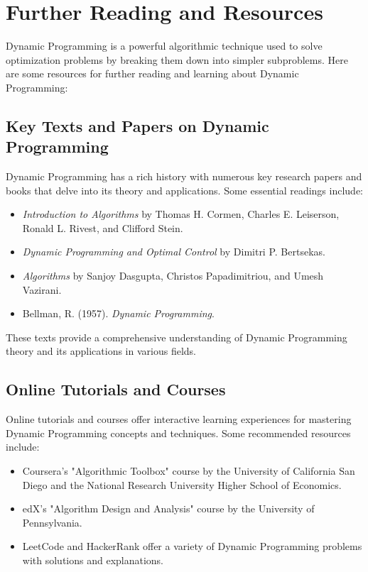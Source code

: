 \documentclass[12pt]{book} %
\begin{document}
\section{Further Reading and Resources}
Dynamic Programming is a powerful algorithmic technique used to solve optimization problems by breaking them down into simpler subproblems. Here are some resources for further reading and learning about Dynamic Programming:

\subsection{Key Texts and Papers on Dynamic Programming}
Dynamic Programming has a rich history with numerous key research papers and books that delve into its theory and applications. Some essential readings include:

\begin{itemize}
    \item \textit{Introduction to Algorithms} by Thomas H. Cormen, Charles E. Leiserson, Ronald L. Rivest, and Clifford Stein.
    \item \textit{Dynamic Programming and Optimal Control} by Dimitri P. Bertsekas.
    \item \textit{Algorithms} by Sanjoy Dasgupta, Christos Papadimitriou, and Umesh Vazirani.
    \item Bellman, R. (1957). \textit{Dynamic Programming}.
\end{itemize}

These texts provide a comprehensive understanding of Dynamic Programming theory and its applications in various fields.

\subsection{Online Tutorials and Courses}
Online tutorials and courses offer interactive learning experiences for mastering Dynamic Programming concepts and techniques. Some recommended resources include:

\begin{itemize}
    \item Coursera's "Algorithmic Toolbox" course by the University of California San Diego and the National Research University Higher School of Economics.
    \item edX's "Algorithm Design and Analysis" course by the University of Pennsylvania.
    \item LeetCode and HackerRank offer a variety of Dynamic Programming problems with solutions and explanations.
\end{itemize}
\end{document}

